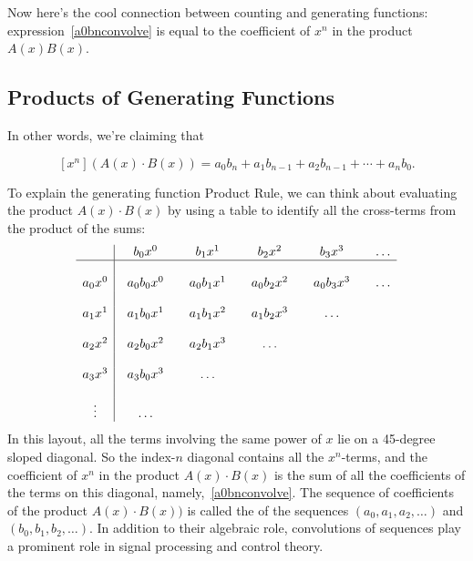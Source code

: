 Now here's the cool connection between counting and generating
functions: expression~\eqref{a0bnconvolve} is equal to the coefficient
of $x^n$ in the product $A(x)B(x)$.

\subsection{Products of Generating Functions}

In other words, we're claiming that
\begin{rul*}[Product]
\begin{equation}\label{xnAxBx}
[x^n](A(x)\cdot B(x)) = a_0b_n + a_1b_{n-1} + a_2b_{n-1} + \cdots +
a_nb_0.
\end{equation}
\end{rul*}
To explain the generating function Product Rule, we can think about
evaluating the product $A(x) \cdot B(x)$ by using a table to identify
all the cross-terms from the product of the sums:
\[
\begin{array}{c|@{\quad}c@{\qquad}c@{\qquad}c@{\qquad}c@{\qquad}c}
      & b_0 x^0 & b_1 x^1 & b_2 x^2 & b_3 x^3 & \dots \\
\hline
\\
a_0 x^0 & a_0 b_0 x^0 & a_0 b_1 x^1 & a_0 b_2 x^2 & a_0 b_3 x^3 & \dots \\
\\
a_1 x^1 & a_1 b_0 x^1 & a_1 b_1 x^2 & a_1 b_2 x^3 & \dots \\
\\
a_2 x^2 & a_2 b_0 x^2 & a_2 b_1 x^3 & \dots \\
\\
a_3 x^3 & a_3 b_0 x^3 & \dots \\
\\
\vdots & \dots\\
\end{array}
\]
In this layout, all the terms involving the same power of $x$ lie on a
45-degree sloped diagonal.  So the index-$n$ diagonal contains all the
$x^n$-terms, and the coefficient of $x^n$ in the product $A(x)\cdot
B(x)$ is the sum of all the coefficients of the terms on this
diagonal, namely,~\eqref{a0bnconvolve}.  The sequence of coefficients
of the product $A(x)\cdot B(x))$ is called the  of
the sequences $(a_0, a_1, a_2, \dots)$ and $(b_0, b_1, b_2, \dots)$.
In addition to their algebraic role, convolutions of sequences play a
prominent role in signal processing and control theory.

